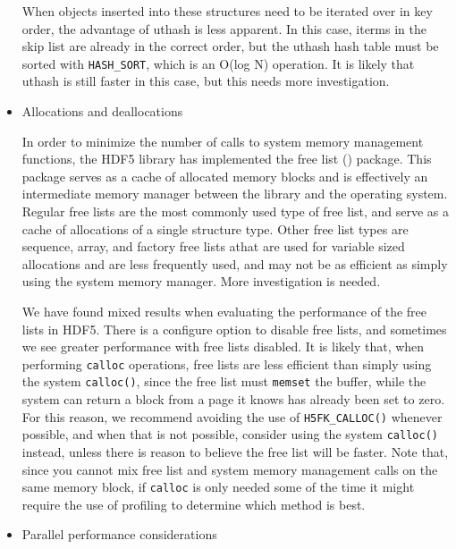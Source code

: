 \begin{itemize}
When objects inserted into these structures need to be iterated over in key order, the advantage of uthash is less apparent. In this case, iterms in the skip list are already in the correct order, but the uthash hash table must be sorted with \texttt{HASH\_SORT}, which is an O(log N) operation. It is likely that uthash is still faster in this case, but this needs more investigation.

    \item Allocations and deallocations

In order to minimize the number of calls to system memory management functions, the HDF5 library has implemented the free list () package. This package serves as a cache of allocated memory blocks and is effectively an intermediate memory manager between the library and the operating system. Regular free lists are the most commonly used type of free list, and serve as a cache of allocations of a single structure type. Other free list types are sequence, array, and factory free lists athat are used for variable sized allocations and are less frequently used, and may not be as efficient as simply using the system memory manager. More investigation is needed.

We have found mixed results when evaluating the performance of the free lists in HDF5. There is a configure option to disable free lists, and sometimes we see greater performance with free lists disabled. It is likely that, when performing \texttt{calloc} operations, free lists are less efficient than simply using the system \texttt{calloc()}, since the free list must \texttt{memset} the buffer, while the system can return a block from a page it knows has already been set to zero. For this reason, we recommend avoiding the use of \texttt{H5FK\_CALLOC()} whenever possible, and when that is not possible, consider using the system \texttt{calloc()} instead, unless there is reason to believe the free list will be faster. Note that, since you cannot mix free list and system memory management calls on the same memory block, if \texttt{calloc} is only needed some of the time it might require the use of profiling to determine which method is best.

    \item Parallel performance considerations
\end{itemize}